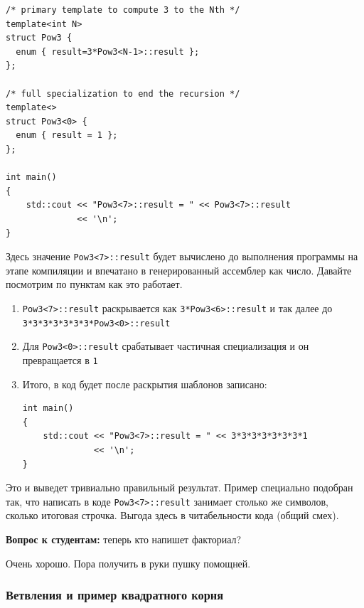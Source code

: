\documentclass[a4paper,12pt,oneside]{article}
\newif\ifanswers
\begin{document}
\begin{lstlisting}
/* primary template to compute 3 to the Nth */
template<int N> 
struct Pow3 { 
  enum { result=3*Pow3<N-1>::result }; 
}; 

/* full specialization to end the recursion */
template<> 
struct Pow3<0> { 
  enum { result = 1 }; 
}; 

int main() 
{ 
    std::cout << "Pow3<7>::result = " << Pow3<7>::result 
              << '\n'; 
} 
\end{lstlisting}

Здесь значение \lstinline!Pow3<7>::result! будет вычислено до выполнения программы на этапе компиляции и впечатано в генерированный ассемблер как число. Давайте посмотрим по пунктам как это работает.

\begin{enumerate}
\item
\lstinline!Pow3<7>::result! раскрывается как \lstinline!3*Pow3<6>::result! и так далее до \lstinline!3*3*3*3*3*3*3*Pow3<0>::result!
\item
Для \lstinline!Pow3<0>::result! срабатывает частичная специализация и он превращается в \lstinline!1!
\item
Итого, в код будет после раскрытия шаблонов записано:
\begin{lstlisting}
int main() 
{ 
    std::cout << "Pow3<7>::result = " << 3*3*3*3*3*3*3*1                                         
              << '\n'; 
} 
\end{lstlisting}
\end{enumerate}

Это и выведет тривиально правильный результат. Пример специально подобран так, что написать в коде \lstinline!Pow3<7>::result! занимает столько же символов, сколько итоговая строчка. Выгода здесь в читабельности кода (общий смех). 

\textbf{Вопрос к студентам:} теперь кто напишет факториал?

\ifanswers
Ответ:

\begin{lstlisting}
template <int n>
struct factorial 
{
  enum { value = n * factorial<n - 1>::value };
};
 
template <>
struct factorial<0> {
  enum { value = 1 };
};
\end{lstlisting}
\fi

Очень хорошо. Пора получить в руки пушку помощней.

\subsubsection{Ветвления и пример квадратного корня}\label{TemplateIfElse}
\end{document}
